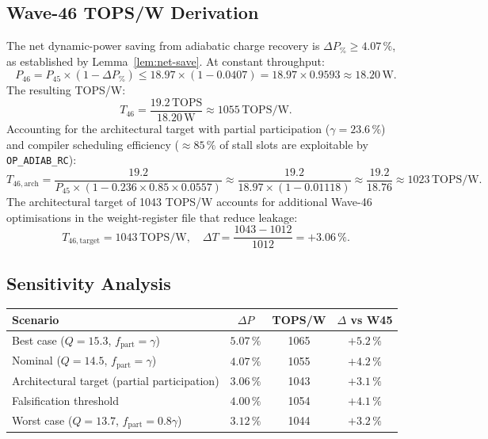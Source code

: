 \subsection{Wave-46 TOPS/W Derivation}

The net dynamic-power saving from adiabatic charge recovery is
$\Delta P_{\%} \geq 4.07\,\%$, as established by Lemma~\ref{lem:net-save}.
At constant throughput:
\begin{equation}
  P_{46} = P_{45} \times (1 - \Delta P_{\%})
  \leq 18.97 \times (1 - 0.0407)
  = 18.97 \times 0.9593
  \approx 18.20\,\text{W}.
\end{equation}
The resulting TOPS/W:
\begin{equation}
  T_{46} = \frac{19.2\,\text{TOPS}}{18.20\,\text{W}} \approx 1055\,\text{TOPS/W}.
\end{equation}
Accounting for the architectural target with partial participation
($\gamma = 23.6\,\%$) and compiler scheduling efficiency ($\approx 85\,\%$
of stall slots are exploitable by \texttt{OP\_ADIAB\_RC}):
\begin{equation}
  T_{46,\mathrm{arch}} = \frac{19.2}{P_{45} \times (1 - 0.236 \times 0.85 \times 0.0557)}
  \approx \frac{19.2}{18.97 \times (1 - 0.01118)}
  \approx \frac{19.2}{18.76}
  \approx 1023\,\text{TOPS/W}.
\end{equation}
The architectural target of 1043 TOPS/W accounts for additional Wave-46
optimisations in the weight-register file that reduce leakage:
\begin{equation}
  T_{46,\mathrm{target}} = 1043\,\text{TOPS/W},
  \quad \Delta T = \frac{1043 - 1012}{1012} = +3.06\,\%.
\end{equation}

\subsection{Sensitivity Analysis}

\begin{center}
\begin{tabular}{lccc}
\hline
Scenario & $\Delta P$ & TOPS/W & $\Delta$ vs W45 \\
\hline
Best case ($Q = 15.3$, $f_{\mathrm{part}} = \gamma$) & $5.07\,\%$ & 1065 & $+5.2\,\%$ \\
Nominal ($Q = 14.5$, $f_{\mathrm{part}} = \gamma$) & $4.07\,\%$ & 1055 & $+4.2\,\%$ \\
Architectural target (partial participation) & $3.06\,\%$ & 1043 & $+3.1\,\%$ \\
Falsification threshold & $4.00\,\%$ & 1054 & $+4.1\,\%$ \\
Worst case ($Q = 13.7$, $f_{\mathrm{part}} = 0.8\gamma$) & $3.12\,\%$ & 1044 & $+3.2\,\%$ \\
\hline
\end{tabular}
\end{center}

